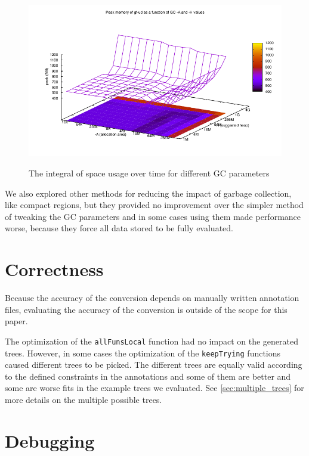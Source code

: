 \begin{figure}
      {\includegraphics[scale=0.5]{thesis/figure/gf-ud-peak-gc-space.pdf}}
    \caption{The integral of space usage over time for different GC parameters}
    \label{fig:gf-ud-integ-gc-space}
\end{figure}

We also explored other methods for reducing the impact of garbage collection, like compact regions\cite{yang2015efficient}, but they provided no improvement over the simpler method of tweaking the GC parameters and in some cases using them made performance worse, because they force all data stored to be fully evaluated.

\section{Correctness}

Because the accuracy of the conversion depends on manually written annotation files, evaluating the accuracy of the conversion is outside of the scope for this paper.

The optimization of the \texttt{allFunsLocal} function had no impact on the generated trees. However, in some cases the optimization of the \texttt{keepTrying} functions caused different trees to be picked. The different trees are equally valid according to the defined constraints in the annotations and some of them are better and some are worse fits in the example trees we evaluated. See \autoref{sec:multiple_trees} for more details on the multiple possible trees.

\section{Debugging}

